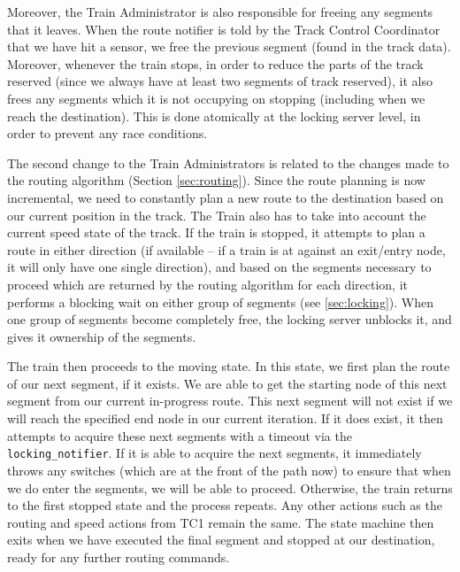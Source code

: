 \documentclass[12pt, titlepage]{article}
\begin{document}
    Moreover, the Train Administrator is also responsible for freeing any segments that it leaves. When the route notifier is told by the Track Control Coordinator that we have hit a sensor, we free the previous segment (found in the track data). Moreover, whenever the train stops, in order to reduce the parts of the track reserved (since we always have at least two segments of track reserved), it also frees any segments which it is not occupying on stopping (including when we reach the destination). This is done atomically at the locking server level, in order to prevent any race conditions.
    
    The second change to the Train Administrators is related to the changes made to the routing algorithm (Section \ref{sec:routing}). Since the route planning is now incremental, we need to constantly plan a new route to the destination based on our current position in the track. The Train also has to take into account the current speed state of the track. If the train is stopped, it attempts to plan a route in either direction (if available -- if a train is at against an exit/entry node, it will only have one single direction), and based on the segments necessary to proceed which are returned by the routing algorithm for each direction, it performs a blocking wait on either group of segments (see \ref{sec:locking}). When one group of segments become completely free, the locking server unblocks it, and gives it ownership of the segments. 
    
    The train then proceeds to the moving state. In this state, we first plan the route of our next segment, if it exists. We are able to get the starting node of this next segment from our current in-progress route. This next segment will not exist if we will reach the specified end node in our current iteration. If it does exist, it then attempts to acquire these next segments with a timeout via the \verb`locking_notifier`. If it is able to acquire the next segments, it immediately throws any switches (which are at the front of the path now) to ensure that when we do enter the segments, we will be able to proceed. Otherwise, the train returns to the first stopped state and the process repeats. Any other actions such as the routing and speed actions from TC1 remain the same. The state machine then exits when we have executed the final segment and stopped at our destination, ready for any further routing commands.
\end{document}
